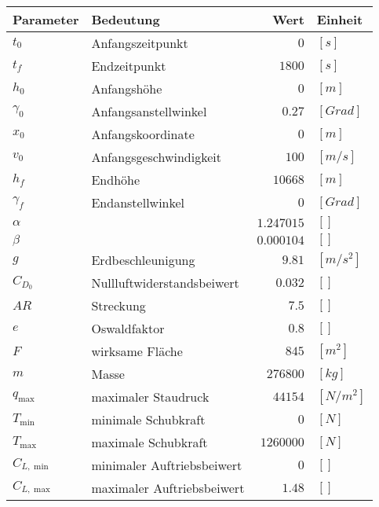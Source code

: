 \begin{center}
\begin{tabular}{|l|l|r|l|}
\hline
Parameter & Bedeutung & Wert & Einheit \\ 
\hline 
\hline
$t_0$ & Anfangszeitpunkt & $0$ & $[s]$ \\ 
$t_f$ & Endzeitpunkt & $1800$ & $[s]$ \\ 
\hline
$h_0$ & Anfangshöhe & $0$ & $[m]$ \\ 
$\gamma_0$ & Anfangsanstellwinkel & $0.27$ & $[Grad]$ \\
$x_0$ & Anfangskoordinate & $0$ & $[m]$ \\ 
$v_0$ & Anfangsgeschwindigkeit & $100$ & $[m/s]$ \\ 
\hline
$h_f$ & Endhöhe & $10668$ & $[m]$ \\ 
$\gamma_f$ & Endanstellwinkel & $0$ & $[Grad]$ \\
\hline
$\alpha$ &  & $1.247015$ & $[]$ \\ 
$\beta$ &  & $0.000104$ & $[]$ \\
$g$ & Erdbeschleunigung & $9.81$ & $[m/s^2]$ \\ 
$C_{D_0}$ & Nullluftwiderstandsbeiwert & $0.032$ & $[]$ \\ 
$AR$ & Streckung & $7.5$ & $[]$ \\ 
$e$ & Oswaldfaktor & $0.8$ & $[]$ \\ 
$F$ & wirksame Fläche & $845$ & $[m^2]$ \\ 
$m$ & Masse & $276800$ & $[kg]$ \\ 
$q_{\max}$ & maximaler Staudruck & $44154$ & $[N/m^2]$ \\
$T_{\min}$ & minimale Schubkraft & $0$ & $[N]$ \\  
$T_{\max}$ & maximale Schubkraft & $1260000$ & $[N]$ \\ 
$C_{L, \min}$ & minimaler Auftriebsbeiwert & $0$ & $[]$ \\ 
$C_{L, \max}$ & maximaler Auftriebsbeiwert & $1.48$ & $[]$ \\ 
\hline
\end{tabular} 
\end{center}














